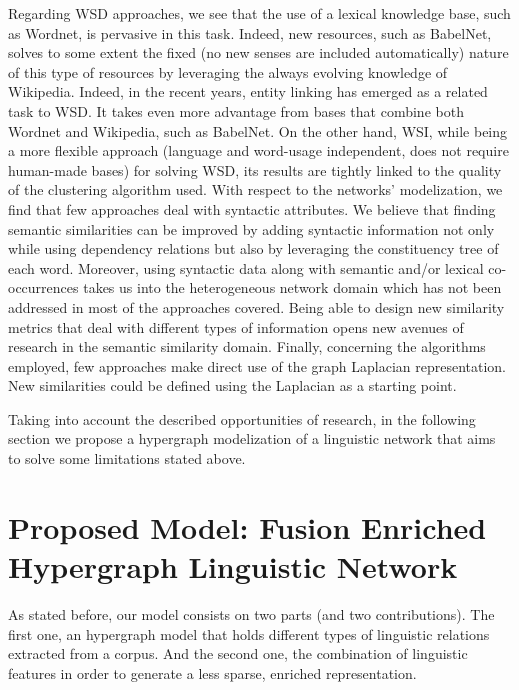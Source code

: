 Regarding WSD approaches, we see that the use of a lexical knowledge base, such as Wordnet, is pervasive in this task. Indeed, new resources, such as BabelNet, solves to some extent the fixed (no new senses are included automatically) nature of this type of resources by leveraging the always evolving knowledge of Wikipedia. Indeed, in the recent years, entity linking has emerged as a related task to WSD. It takes even more advantage from bases that combine both Wordnet and Wikipedia, such as BabelNet. On the other hand, WSI, while being a more flexible approach (language and word-usage independent, does not require human-made bases)  for solving WSD, its results are tightly linked to the quality of the clustering algorithm used. 
% 
 With respect to the networks' modelization, we find that few approaches deal with syntactic attributes. We believe that finding semantic similarities can be improved by adding syntactic information not only  while using dependency relations but also by leveraging the constituency tree of each word. Moreover, using syntactic data along with semantic and/or lexical co-occurrences takes us into the heterogeneous network domain which has not been addressed in most of the approaches covered. Being able to design new similarity metrics that deal with different types of information opens new avenues of research in the semantic similarity domain. Finally, concerning the algorithms employed, few approaches make direct use of the graph Laplacian representation. New similarities could be defined using the Laplacian as a starting point. 


Taking into account the described opportunities of research, in the following section we propose a  hypergraph modelization of a linguistic network that aims to solve some limitations stated above. 


 
\section{Proposed Model: Fusion Enriched Hypergraph Linguistic Network}
\label{sec:enriched_hypergraph}

As stated before, our model consists on two parts (and two contributions). The first one, an hypergraph model that holds different types of linguistic relations extracted from a corpus. And the second one, the combination of linguistic features in order to generate a less sparse, enriched representation. 

